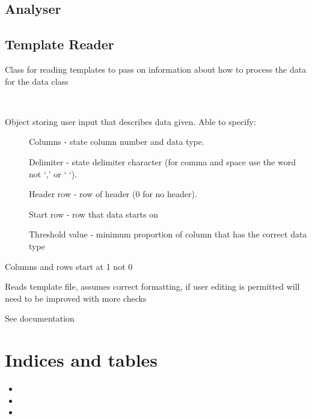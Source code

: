 \documentclass[letterpaper,10pt,english]{sphinxmanual}
\begin{document}
\section{Analyser}
\label{Code_rst/analy:analyser}\label{Code_rst/analy::doc}

\section{Template Reader}
\label{Code_rst/temp_rd:module-template_reader}\label{Code_rst/temp_rd::doc}\label{Code_rst/temp_rd:template-reader}
Class for reading templates to pass on information about how
to process the data for the data class

\begin{fulllineitems}
\label{Code_rst/temp_rd:template_reader.Template}~\begin{description}
\item[{Object storing user input that describes data given. Able to specify:}] \leavevmode
Columns - state column number and data type.

Delimiter - state delimiter character (for comma and space use the word not `,' or ` `).

Header row - row of header (0 for no header).

Start row - row that data starts on

Threshold value - minimum proportion of column that has the correct data type

\end{description}

Columns and rows start at 1 not 0

\begin{fulllineitems}
\label{Code_rst/temp_rd:template_reader.Template.read}
Reads template file, assumes correct formatting, if user editing
is permitted will need to be improved with more checks

See documentation

\end{fulllineitems}


\end{fulllineitems}



\chapter{Indices and tables}
\label{index:indices-and-tables}\begin{itemize}
\item {} 

\item {} 

\item {} 

\end{itemize}
\end{document}

